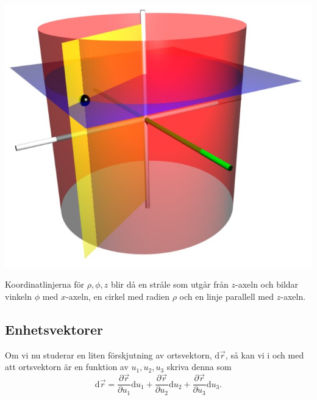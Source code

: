 \documentclass[%
oneside,                 %
final,                   %
10pt]{article}
\newenvironment{notice_mdfboxadmon}[1][]{
\begin{notice_mdfboxmdframed}[frametitle=#1]
}
{
\end{notice_mdfboxmdframed}
}
\begin{document}
\begin{notice_mdfboxadmon}
\vspace{6mm}

\centerline{\includegraphics[width=0.8\linewidth]{fig/Cylindrical_coordinate_surfaces.png}}

\vspace{6mm}



Koordinatlinjerna för $\rho, \phi, z$ blir då en stråle som utgår från $z$-axeln och bildar vinkeln $\phi$ med $x$-axeln, en cirkel med radien $\rho$ och en linje parallell med $z$-axeln.
\end{notice_mdfboxadmon} %



\subsection{Enhetsvektorer}
Om vi nu studerar en liten förskjutning av ortsvektorn, $\mbox{d}\vec{r}$, så kan vi i och med att ortsvektorn är en funktion av $u_1, u_2, u_3$ skriva denna som 
\begin{equation}
  \mbox{d}\vec{r} = \frac{\partial \vec{r}}{\partial u_1} \mbox{d}u_1 +
\frac{\partial \vec{r}}{\partial u_2} \mbox{d}u_2 + 
\frac{\partial \vec{r}}{\partial u_3} \mbox{d}u_3.
\label{eq:forskjutningsvektor}
\end{equation}
\end{document}
